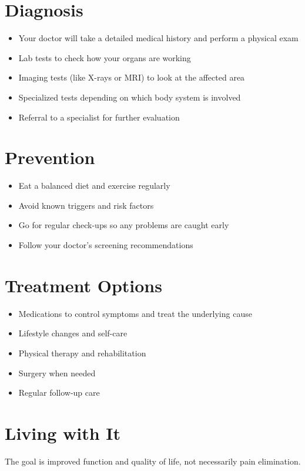 \section{Diagnosis}

\begin{itemize}[noitemsep]
  \item Your doctor will take a detailed medical history and perform a physical exam
  \item Lab tests to check how your organs are working
  \item Imaging tests (like X-rays or MRI) to look at the affected area
  \item Specialized tests depending on which body system is involved
  \item Referral to a specialist for further evaluation
\end{itemize}

\section{Prevention}

\begin{itemize}[noitemsep]
  \item Eat a balanced diet and exercise regularly
  \item Avoid known triggers and risk factors
  \item Go for regular check-ups so any problems are caught early
  \item Follow your doctor's screening recommendations
\end{itemize}

\section{Treatment Options}

\begin{itemize}[noitemsep]
  \item Medications to control symptoms and treat the underlying cause
  \item Lifestyle changes and self-care
  \item Physical therapy and rehabilitation
  \item Surgery when needed
  \item Regular follow-up care
\end{itemize}

\section{Living with It}
The goal is improved function and quality of life, not necessarily pain elimination.

